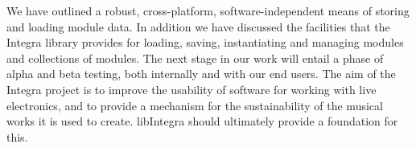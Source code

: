 We have outlined a robust, cross-platform, software-independent means
of storing and loading module data. In addition we have discussed the
facilities that the Integra library provides for loading, saving,
instantiating and managing modules and collections of modules. The
next stage in our work will entail a phase of alpha and beta testing,
both internally and with our end users. The aim of the Integra project
is to improve the usability of software for working with live
electronics, and to provide a mechanism for the sustainability of the
musical works it is used to create. libIntegra should ultimately
provide a foundation for this.

